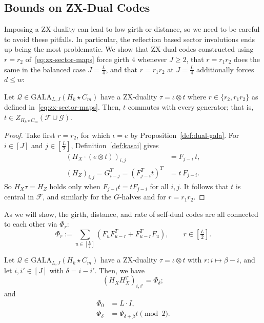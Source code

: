 \subsection{Bounds on ZX-Dual Codes}\label{ssec:zx-bounds}
Imposing a ZX-duality can lead to low girth or distance, so we need to be careful to avoid these pitfalls. In particular, the reflection based sector involutions ends up being the most problematic. We show that ZX-dual codes constructed using $r = r_2$ of~\eqref{eq:zx-sector-maps} force girth $4$ whenever $J\geq2$, that $r = r_1r_2$ does the same in the balanced case $J = \tfrac L4$, and that $r = r_1r_2$ at $J=\tfrac L4$ additionally forces $d\leq w$:

\begin{lemma}[Centrality of $t$]\label{lem:t-central}
Let $\mathcal Q\in \mathrm{GALA}_{L,J}(H_k\star C_m)$ have a ZX-duality $\tau =\iota \otimes t$ where $r\in \{r_2, r_1r_2\}$ as defined in~\eqref{eq:zx-sector-maps}.  Then, $t$ commutes with every generator; that is, $t\in Z_{H_k\star C_m}(\mathcal{F}\cup\mathcal{G})$.
\end{lemma}
\begin{proof}
Take first $r = r_2$, for which $\iota = e$ by Proposition~\ref{def:dual-gala}. For $i\in[J]$ and $j\in[\frac L2]$, Definition~\ref{def:kasai} gives
\begin{align*}
(H_X\cdot(e\otimes t))_{i,j} &=F_{j-i}\,t, \\
(H_Z)_{i,j} = G^T_{i-j} = \left(F^T_{j-i}t\right)^T &= t\,F_{j-i}.
\end{align*}
So $H_X\tau = H_Z$ holds only when $F_{j-i}t = tF_{j-i}$ for all $i,j$. It follows that $t$ is central in $\mathcal{F}$, and similarly for the $G$-halves and for $r = r_1r_2$.
\end{proof}

As we will show, the girth, distance, and rate of self-dual codes are all connected to each other via $\Phi_r$:
\begin{equation}\label{eq:zx-gram-block}
    \Phi_r:= \sum_{u\in[\frac{L}{2}]}\left(F_uF^T_{u-r} + F^T_{u-r}F_u\right),
    \qquad r\in[\tfrac{L}{2}].
\end{equation}

\begin{lemma}\label{lem:zx-gram}
Let $\mathcal Q\in \mathrm{GALA}_{L,J}(H_k\star C_m)$ have a ZX-duality $\tau =\iota \otimes t$ with $r: i\mapsto \beta -i$, and let $i,i'\in[J]$ with $\delta = i-i'$. Then, we have
\begin{equation}\label{eq:zx-gram-refl}
    \left(H_XH_X^T\right)_{i,i'} =\Phi_\delta;
\end{equation}
and 
\begin{align}\label{eq:phi-zero}
   \Phi_0 &= L\cdot I,\\
    \Phi_\delta &= \Psi_{\delta + \beta}t \pmod 2.
\end{align}
\end{lemma}


